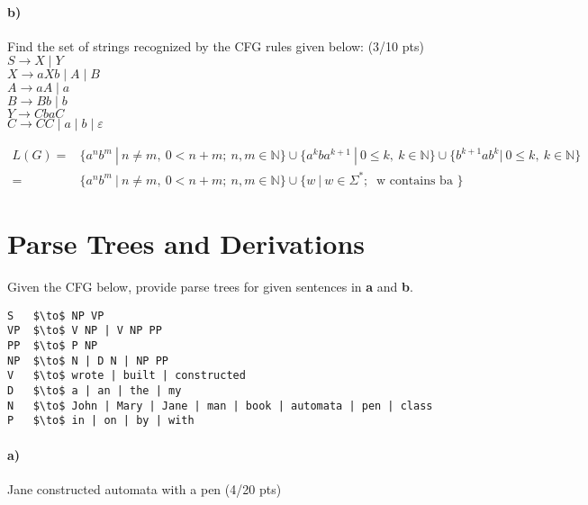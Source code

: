 \documentclass[a4paper,12pt]{article}
\begin{document}
\paragraph{b)} Find the set of strings recognized by the CFG rules given below:         \hfill \small{(3/10 pts)} \\


$S \to X \mid Y$ \\
$X \to aXb \mid A \mid B$ \\
$A \to aA \mid a$ \\
$B \to Bb \mid b$ \\
$Y \to CbaC$ \\
$C \to CC \mid a \mid b \mid \varepsilon$  \\

\begin{tcolorbox}
\begin{equation}
\begin{split}
L(G) = & \{a^nb^m\ |\  n\neq m,\ 0<n+m;\ n,m\in \mathbb{N}\} \cup \{a^kba^{k+1}\ |\  0\leq k,\ k\in \mathbb{N} \} \cup \{b^{k+1}ab^k |\  0\leq k,\ k\in \mathbb{N} \} \\
          = &  \{a^nb^m\ |\  n\neq m,\ 0<n+m;\ n,m\in \mathbb{N}\} \cup \{w\ |\ w\in \Sigma^*;\ \text{ w contains ba } \}
\end{split}
\end{equation}
\end{tcolorbox}


\newpage
\section{Parse Trees and Derivations \hfill {}}
Given the CFG below, provide parse trees for given sentences in \textbf{a} and \textbf{b}.\\

\begin{lstlisting}[style=output,mathescape=true]
S   $\to$ NP VP
VP  $\to$ V NP | V NP PP
PP  $\to$ P NP
NP  $\to$ N | D N | NP PP
V   $\to$ wrote | built | constructed
D   $\to$ a | an | the | my
N   $\to$ John | Mary | Jane | man | book | automata | pen | class
P   $\to$ in | on | by | with
\end{lstlisting}

\paragraph{a)} Jane constructed automata with a pen \hfill \small{(4/20 pts)} \\
\end{document}
